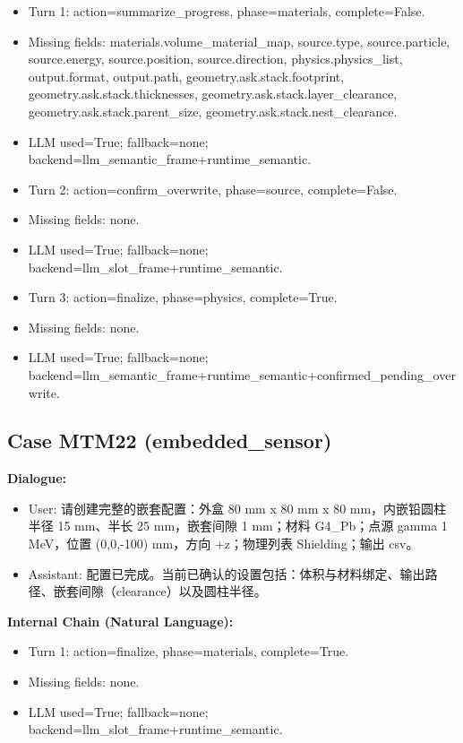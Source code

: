 \documentclass[11pt]{ctexart}
\begin{document}
\begin{itemize}
\item Turn 1: action=summarize\_progress, phase=materials, complete=False.
\item Missing fields: materials.volume\_material\_map, source.type, source.particle, source.energy, source.position, source.direction, physics.physics\_list, output.format, output.path, geometry.ask.stack.footprint, geometry.ask.stack.thicknesses, geometry.ask.stack.layer\_clearance, geometry.ask.stack.parent\_size, geometry.ask.stack.nest\_clearance.
\item LLM used=True; fallback=none; backend=llm\_semantic\_frame+runtime\_semantic.
\item Turn 2: action=confirm\_overwrite, phase=source, complete=False.
\item Missing fields: none.
\item LLM used=True; fallback=none; backend=llm\_slot\_frame+runtime\_semantic.
\item Turn 3: action=finalize, phase=physics, complete=True.
\item Missing fields: none.
\item LLM used=True; fallback=none; backend=llm\_semantic\_frame+runtime\_semantic+confirmed\_pending\_overwrite.
\end{itemize}
\subsection{Case MTM22 (embedded\_sensor)}
\textbf{Dialogue:}
\begin{itemize}
\item User: 请创建完整的嵌套配置：外盒 80 mm x 80 mm x 80 mm，内嵌铅圆柱半径 15 mm、半长 25 mm，嵌套间隙 1 mm；材料 G4\_Pb；点源 gamma 1 MeV，位置 (0,0,-100) mm，方向 +z；物理列表 Shielding；输出 csv。
\item Assistant: 配置已完成。当前已确认的设置包括：体积与材料绑定、输出路径、嵌套间隙（clearance）以及圆柱半径。
\end{itemize}
\textbf{Internal Chain (Natural Language):}
\begin{itemize}
\item Turn 1: action=finalize, phase=materials, complete=True.
\item Missing fields: none.
\item LLM used=True; fallback=none; backend=llm\_slot\_frame+runtime\_semantic.
\end{itemize}
\end{document}

